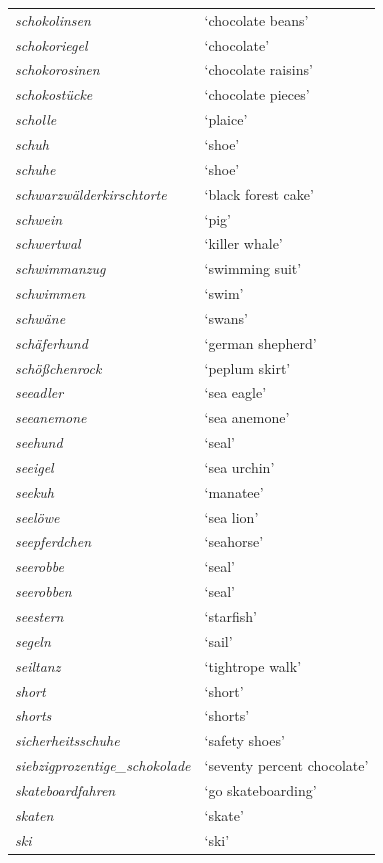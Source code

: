 \begin{longtable}{ll}
\textit{schokolinsen} & `chocolate beans' \\
\textit{schokoriegel} & `chocolate' \\
\textit{schokorosinen} & `chocolate raisins' \\
\textit{schokostücke} & `chocolate pieces' \\
\textit{scholle} & `plaice' \\
\textit{schuh} & `shoe' \\
\textit{schuhe} & `shoe' \\
\textit{schwarzwälderkirschtorte} & `black forest cake' \\
\textit{schwein} & `pig' \\
\textit{schwertwal} & `killer whale' \\
\textit{schwimmanzug} & `swimming suit' \\
\textit{schwimmen} & `swim' \\
\textit{schwäne} & `swans' \\
\textit{schäferhund} & `german shepherd' \\
\textit{schößchenrock} & `peplum skirt' \\
\textit{seeadler} & `sea ​​eagle' \\
\textit{seeanemone} & `sea ​​anemone' \\
\textit{seehund} & `seal' \\
\textit{seeigel} & `sea ​​urchin' \\
\textit{seekuh} & `manatee' \\
\textit{seelöwe} & `sea ​​lion' \\
\textit{seepferdchen} & `seahorse' \\
\textit{seerobbe} & `seal' \\
\textit{seerobben} & `seal' \\
\textit{seestern} & `starfish' \\
\textit{segeln} & `sail' \\
\textit{seiltanz} & `tightrope walk' \\
\textit{short} & `short' \\
\textit{shorts} & `shorts' \\
\textit{sicherheitsschuhe} & `safety shoes' \\
\textit{siebzigprozentige\_schokolade} & `seventy percent chocolate' \\
\textit{skateboardfahren} & `go skateboarding' \\
\textit{skaten} & `skate' \\
\textit{ski} & `ski' \\

\end{longtable}
